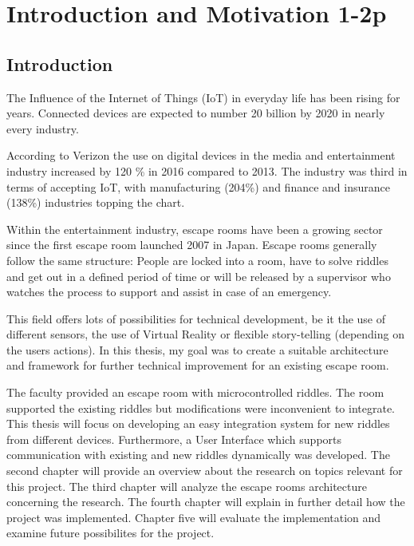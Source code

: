 
\chapter{Introduction and Motivation 1-2p} %

\label{Chapter1} %


\section{Introduction}

The Influence of the Internet of Things (IoT) in everyday life has been rising for years.
Connected devices are expected to number 20 billion \parencite{gartner0} by 2020 in nearly every industry.

According to Verizon \parencite{verizon} the use on digital devices in the media and entertainment industry increased by 120 \% in 2016 compared to 2013.
The industry was third in terms of accepting IoT,
with manufacturing (204\%) and finance and insurance (138\%) industries topping the chart.

Within the entertainment industry, escape rooms have been a growing sector since the first escape room launched 2007 in Japan.
Escape rooms generally follow the same structure: People are locked into a room, have to solve riddles
and get out in a defined period of time or will be released by a supervisor who watches the process to support
and assist in case of an emergency.

This field offers lots of possibilities for technical development, be it the use of different sensors, the use of Virtual Reality or flexible story-telling (depending on the users actions).
In this thesis, my goal was to create a suitable architecture and framework for further technical improvement for an existing escape room.

The faculty provided an escape room with microcontrolled riddles.
The room supported the existing riddles but  modifications were inconvenient to integrate.
This thesis will focus on developing an easy integration system for new riddles from different devices.
Furthermore, a User Interface which supports communication with existing and new riddles dynamically was developed.
The second chapter will provide an overview about the research on topics relevant for this project. 
The third chapter will analyze the escape rooms architecture concerning the research. 
The fourth chapter will explain in further detail how the project was implemented. 
Chapter five will evaluate the implementation and examine future possibilites for the project.

